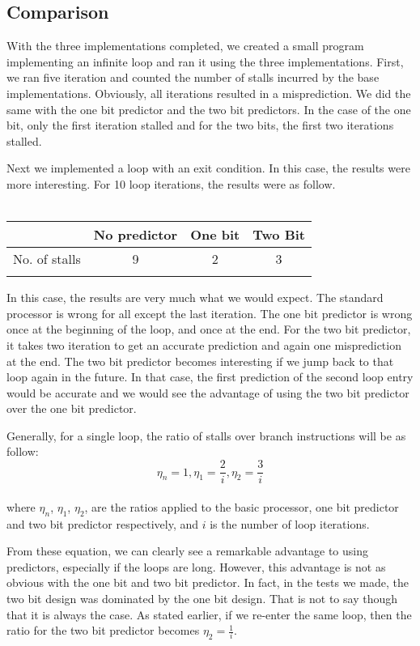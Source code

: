 \documentclass[12pt]{IEEEtran} %
\begin{document}
\subsection{Comparison} %
\label{sub:comparison}
With the three implementations completed, we created a small program implementing an infinite loop and ran it using the three implementations. First, we ran five iteration and counted the number of stalls incurred by the base implementations. Obviously, all iterations resulted in a misprediction. We did the same with the one bit predictor and the two bit predictors. In the case of the one bit, only the first iteration stalled and for the two bits, the first two iterations stalled.

Next we implemented a loop with an exit condition. In this case, the results were more interesting. For 10 loop iterations, the results were as follow.\\
\\
\begin{tabular}{c c c c}
& No predictor & One bit & Two Bit \\
\hline
No. of stalls & 9 & 2 & 3 \\
\hline
\\
\end{tabular}

In this case, the results are very much what we would expect. The standard processor is wrong for all except the last iteration. The one bit predictor is wrong once at the beginning of the loop, and once at the end. For the two bit predictor, it takes two iteration to get an accurate prediction and again one misprediction at the end. The two bit predictor becomes interesting if we jump back to that loop again in the future. In that case, the first prediction of the second loop entry would be accurate and we would see the advantage of using the two bit predictor over the one bit predictor. 

Generally, for a single loop, the ratio of stalls over branch instructions will be as follow:
$$\eta_n = 1, \eta_1 = \frac{2}{i}, \eta_2 = \frac{3}{i}$$\\
where $\eta_n$, $\eta_1$, $\eta_2$, are the ratios applied to the basic processor, one bit predictor and two bit predictor respectively, and $i$ is the number of loop iterations.

From these equation, we can clearly see a remarkable advantage to using predictors, especially if the loops are long. However, this advantage is not as obvious with the one bit and two bit predictor. In fact, in the tests we made, the two bit design was dominated by the one bit design. That is not to say though that it is always the case. As stated earlier, if we re-enter the same loop, then the ratio for the two bit predictor becomes $\eta_2 = \frac{1}{i}$.
\end{document}
